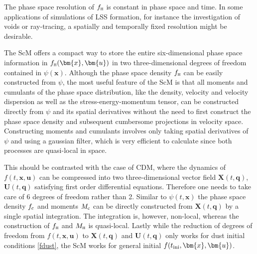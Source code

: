 \documentclass[twocolumn, nofootinbib, showpacs, superscriptaddress]{revtex4-1}
\renewcommand{\H}[0]{{\textsc{h}}}
\newcommand{\vx}[0]{\bm{x} }
\newcommand{\vX}[0]{\bm{X} }
\newcommand{\vq}[0]{\bm{q} }
\newcommand{\vu}[0]{\bm{u} }
\newcommand{\vU}[0]{\bm{U} }
\begin{document}
The phase space resolution of $f_\H$ is constant in phase space and time. 
In some applications of simulations of LSS formation, for instance the investigation of voids or ray-tracing, a spatially and temporally fixed 
resolution might be desirable.  

The ScM offers a compact way to store the entire six-dimensional 
 phase space information in $f_\H(\vx,\vu)$ in  two three-dimensional degrees of freedom contained in $\psi(\vx)$. 
Although the phase space density $f_\H$ can be easily constructed from $\psi$, the most useful feature of the ScM is that 
all moments and cumulants of the phase space distribution, like the density, velocity and velocity dispersion as well as the 
stress-energy-momentum tensor, can be constructed directly from $\psi$ and its spatial derivatives without the need to first 
construct the phase space density and subsequent cumbersome projections in velocity space.
Constructing moments and cumulants involves only taking spatial derivatives of $\psi$ and using a gaussian filter,
 which is very efficient to calculate since both processes are quasi-local in space. 

This should be contrasted with the case of CDM, where the dynamics of $f(t,\vx,\vu)$ can be compressed into two three-dimensional vector field $\vX(t,\vq)$, $\vU(t,\vq)$ satisfying first order differential equations. Therefore one needs to take care of 6 degrees of freedom rather than 2.
 Similar to $\psi(t,\vx)$ the phase space density $f_{\rm c}$ and moments $M_{\rm c}$ can be directly constructed from $\vX(t,\vq)$ by a single spatial integration. The integration is, however, non-local, whereas the construction of $f_\H$ and $M_\H$ is quasi-local. 
Lastly while the reduction of degrees of freedom from $f(t,\vx,\vu)$ to $\vX(t,\vq)$ and $\vU(t,\vq)$ only works for dust initial conditions \eqref{fdust}, the ScM works for general initial $f(t_{\rm ini},\vx,\vu)$.

\label{subsection:husimivlasovmap}
\end{document}
